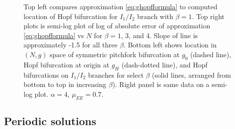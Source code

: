 \documentclass[reqno]{siamonline190516}
\begin{document}
\begin{figure}
\begin{tabular}{cc}
    \end{tabular}
    \caption{Top left compares approximation \cref{eq:ghopfformula} to computed location of Hopf bifurcation for $I_1/I_2$ branch with $\beta = 1$. Top right plots is semi-log plot of log of absolute error of approximation \cref{eq:ghopfformula} vs $N$ for $\beta = 1$, 3, and 4. Slope of line is approximately -1.5 for all three $\beta$. Bottom left shows location in $(N, g)$ space of symmetric pitchfork bifurcation at $g_0$ (dashed line), Hopf bifurcation at origin at $g_H$ (dash-dotted line), and Hopf bifurcations on $I_1/I_2$ branches for select $\beta$ (solid lines, arranged from bottom to top in increasing $\beta$). Right panel is same data on a semi-log plot. $\alpha = 4$, $\mu_{EE}= 0.7$. }
    \label{fig:Hopfplots}
\end{figure}


\subsection{Periodic solutions}\label{sec:periodic}
\end{document}
